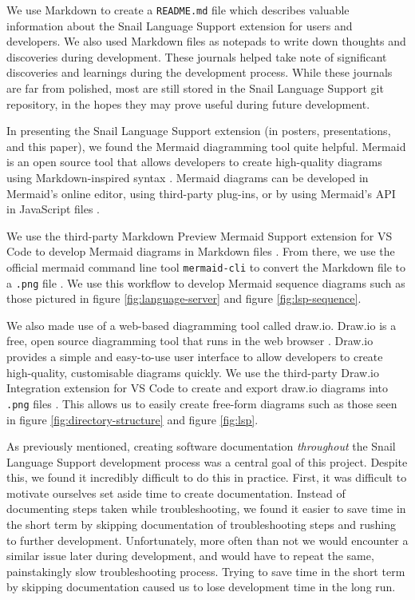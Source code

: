 \documentclass{article}
\begin{document}
We use Markdown to create a \lstinline{README.md} file which describes valuable information about the Snail Language Support extension for users and developers. We also used Markdown files as notepads to write down thoughts and discoveries during development. These journals helped take note of significant discoveries and learnings during the development process. While these journals are far from polished, most are still stored in the Snail Language Support git repository, in the hopes they may prove useful during future development. 

In presenting the Snail Language Support extension (in posters, presentations, and this paper), we found the Mermaid diagramming tool quite helpful. Mermaid is an open source tool that allows developers to create high-quality diagrams using Markdown-inspired syntax \cite{MermaidJS_2023a}. Mermaid diagrams can be developed in Mermaid's online editor, using third-party plug-ins, or by using Mermaid's API in JavaScript files \cite{MermaidJS_2023b}. 

We use the third-party Markdown Preview Mermaid Support extension for VS Code to develop Mermaid diagrams in Markdown files \cite{Bierner_2023}. From there, we use the official mermaid command line tool \lstinline{mermaid-cli} to convert the Markdown file to a \lstinline{.png} file \cite{MermaidJS_2023c}. We use this workflow to develop Mermaid sequence diagrams such as those pictured in figure \ref{fig:language-server} and figure \ref{fig:lsp-sequence}. 

We also made use of a web-based diagramming tool called draw.io. Draw.io is a free, open source diagramming tool that runs in the web browser \cite{drawio_2023}. Draw.io provides a simple and easy-to-use user interface to allow developers to create high-quality, customisable diagrams quickly. We use the third-party Draw.io Integration extension for VS Code to create and export draw.io diagrams into \lstinline{.png} files \cite{Dieterichs_2023}. This allows us to easily create free-form diagrams such as those seen in figure \ref{fig:directory-structure} and figure \ref{fig:lsp}.

As previously mentioned, creating software documentation \emph{throughout} the Snail Language Support development process was a central goal of this project. Despite this, we found it incredibly difficult to do this in practice. First, it was difficult to motivate ourselves set aside time to create documentation. Instead of documenting steps taken while troubleshooting, we found it easier to save time in the short term by skipping documentation of troubleshooting steps and rushing to further development. Unfortunately, more often than not we would encounter a similar issue later during development, and would have to repeat the same, painstakingly slow troubleshooting process. Trying to save time in the short term by skipping documentation caused us to lose development time in the long run.
\end{document}

